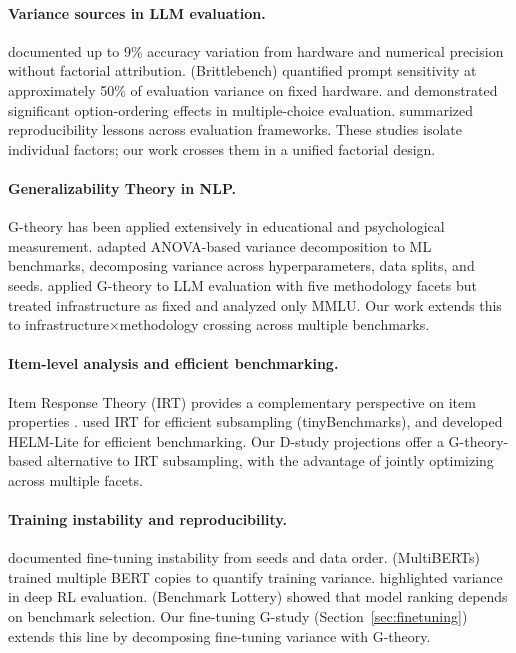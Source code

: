 \documentclass[11pt,twocolumn]{article}
\begin{document}
\paragraph{Variance sources in LLM evaluation.}
\citet{yuan2025} documented up to 9\% accuracy variation from hardware and numerical precision without factorial attribution. \citet{mizrahi2024} (Brittlebench) quantified prompt sensitivity at approximately 50\% of evaluation variance on fixed hardware. \citet{lu2022} and \citet{pezeshkpour2024} demonstrated significant option-ordering effects in multiple-choice evaluation. \citet{biderman2024} summarized reproducibility lessons across evaluation frameworks. These studies isolate individual factors; our work crosses them in a unified factorial design.

\paragraph{Generalizability Theory in NLP.}
G-theory \citep{shavelson1991,brennan2001} has been applied extensively in educational and psychological measurement. \citet{bouthillier2021} adapted ANOVA-based variance decomposition to ML benchmarks, decomposing variance across hyperparameters, data splits, and seeds. \citet{mesting2026} applied G-theory to LLM evaluation with five methodology facets but treated infrastructure as fixed and analyzed only MMLU. Our work extends this to infrastructure$\times$methodology crossing across multiple benchmarks.

\paragraph{Item-level analysis and efficient benchmarking.}
Item Response Theory (IRT) provides a complementary perspective on item properties \citep{lalor2019,rodriguez2021,vania2021}. \citet{polo2024} used IRT for efficient subsampling (tinyBenchmarks), and \citet{perlitz2023} developed HELM-Lite for efficient benchmarking. Our D-study projections offer a G-theory-based alternative to IRT subsampling, with the advantage of jointly optimizing across multiple facets.

\paragraph{Training instability and reproducibility.}
\citet{dodge2020} documented fine-tuning instability from seeds and data order. \citet{sellam2022} (MultiBERTs) trained multiple BERT copies to quantify training variance. \citet{henderson2018} highlighted variance in deep RL evaluation. \citet{dehghani2021} (Benchmark Lottery) showed that model ranking depends on benchmark selection. Our fine-tuning G-study (Section~\ref{sec:finetuning}) extends this line by decomposing fine-tuning variance with G-theory.
\end{document}
